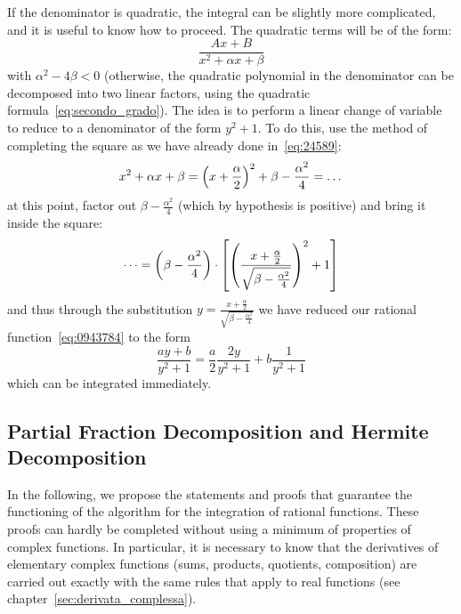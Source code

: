 If the denominator is quadratic, the integral can be slightly more complicated,
and it is useful to know how to proceed. The quadratic terms
will be of the form:
\begin{equation}\label{eq:0943784}
\frac{Ax + B}{x^2 + \alpha x + \beta}
\end{equation}
with $\alpha^2-4\beta<0$ (otherwise, the quadratic polynomial
in the denominator can be decomposed into two linear factors, using
the quadratic formula~\eqref{eq:secondo_grado}). The idea is to perform a linear
change
of variable to reduce to a denominator
of the form $y^2+1$. To do this, use the method of completing the square as we
have already done in~\eqref{eq:24589}:
\[
  x^2 + \alpha x + \beta
  = {\left( x+\frac\alpha 2 \right)}^2  + \beta - \frac{\alpha^2}{4}
  = \dots
\]
at this point, factor out $\beta-\frac{\alpha^2}{4}$
(which by hypothesis is positive)
and bring it inside the square:
\[
 \dots = {\left( \beta-\frac{\alpha^2}{4} \right)}\cdot{\left[ {\left( \frac{x+\frac \alpha 2}{\sqrt{\beta -\frac{\alpha^2}{4}}} \right)}^2 + 1 \right]}
\]
and thus through the substitution $y=\frac{x + \frac \alpha 2 }{\sqrt{\beta -
\frac{\alpha^2}{4}}}$
we have reduced our rational function~\eqref{eq:0943784}
to the form
\[
  \frac{a y + b}{y^2 + 1} = \frac a 2 \frac{2y}{y^2+1} + b\frac{1}{y^2+1}
\]
which can be integrated immediately.

\subsection{Partial Fraction Decomposition and Hermite Decomposition}
%
%
%
%

In the following, we propose the statements and proofs that guarantee
the functioning of the algorithm for the integration of rational functions.
These proofs can hardly be completed
without using a minimum of properties of complex functions. In particular, it is
necessary to know that the derivatives of elementary complex functions
(sums, products, quotients, composition) are carried out exactly
with the same rules that apply to real functions (see
chapter~\ref{sec:derivata_complessa}).

